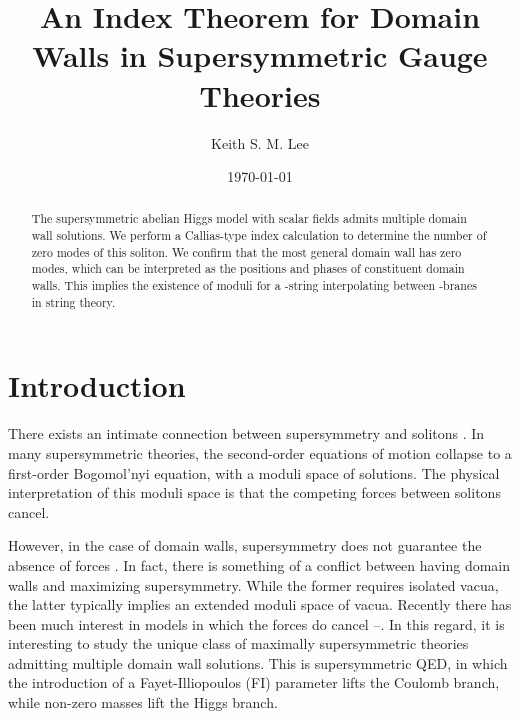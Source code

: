 \documentclass[a4paper,preprint,preprintnumbers,amsmath,amssymb]{revtex4}
\begin{document}

\title{An Index Theorem for Domain Walls in Supersymmetric Gauge Theories}

\author{Keith S. M. Lee}
%

\date{\today}

\begin{abstract}
The supersymmetric abelian Higgs model with \coordHE{} scalar fields admits 
multiple domain wall solutions. We perform a Callias-type index 
calculation to determine the number of zero modes of this 
soliton. We confirm that the most general domain wall has 
\coordHE{} zero modes, which can be interpreted as the 
positions and phases of \coordHE{} constituent domain walls. This 
implies the existence of moduli for a \coordHE{}-string interpolating 
between \coordHE{}  \coordHE{}-branes in \coordHE{} string theory.
\end{abstract}

\maketitle

\section{\label{sec:intro} Introduction}

There exists an intimate connection between supersymmetry and solitons
\cite{WO78}. 
In many supersymmetric theories, the second-order equations of motion collapse 
to a first-order Bogomol'nyi equation, with a moduli space of solutions. 
The physical interpretation of this moduli space is that the competing 
forces between solitons cancel.

However, in the case of domain walls, supersymmetry does not 
guarantee the absence of forces \cite{PT02}.
In fact, there is something of a conflict between having domain walls and 
maximizing supersymmetry. While the former requires isolated vacua, 
the latter typically implies an extended moduli space of vacua. 
Recently there has been much interest in models in which the forces do
cancel \cite{ms98}--\cite{PV01}. 
In this regard, it is interesting to study the unique class of maximally
supersymmetric theories admitting multiple domain wall solutions.
This is \coordHE{} supersymmetric QED, in which the introduction of a 
Fayet-Illiopoulos (FI) parameter lifts the Coulomb branch, while 
non-zero masses lift the Higgs branch. 
\end{document}
